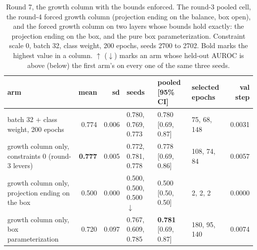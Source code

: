 \begin{table}[H]
  \centering
  \footnotesize
  \caption[Round 7, the growth column with the bounds enforced]{Round 7, the growth column with the bounds enforced. The round-3 pooled cell, the round-4 forced growth column (projection ending on the balance, box open), and the forced growth column on two layers whose bounds hold exactly: the projection ending on the box, and the pure box parameterization. Constraint scale 0, batch 32, class weight, 200 epochs, seeds 2700 to 2702. Bold marks the highest value in a column. $\uparrow$ ($\downarrow$) marks an arm whose held-out AUROC is above (below) the first arm's on every one of the same three seeds.}
  \label{tab:w18}
  \begin{tabular}{@{}lrrlllr@{}}
    \hline
    arm & mean & sd & seeds & pooled [95\% CI] & selected epochs & val step \\
    \hline
    batch 32 $+$ class weight, 200 epochs & 0.774 & 0.006 & 0.780, 0.769, 0.773 & 0.780 [0.69, 0.87] & 75, 68, 148 & 0.0031 \\
    growth column only, constraints 0 (round-3 levers) & \textbf{0.777} & 0.005 & 0.772, 0.781, 0.778 & 0.778 [0.69, 0.86] & 108, 74, 84 & 0.0057 \\
    growth column only, projection ending on the box & 0.500 & 0.000 & 0.500, 0.500, 0.500 $\downarrow$ & 0.500 [0.50, 0.50] & 2, 2, 2 & 0.0000 \\
    growth column only, box parameterization & 0.720 & 0.097 & 0.767, 0.609, 0.785 & \textbf{0.781} [0.69, 0.87] & 180, 95, 140 & 0.0074 \\
    \hline
  \end{tabular}
\end{table}
